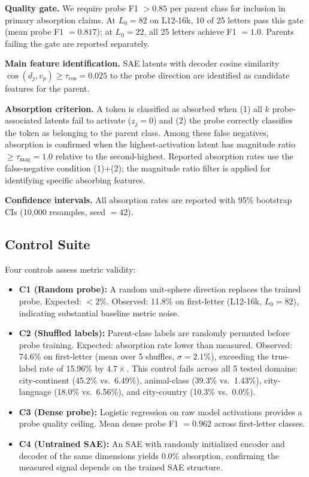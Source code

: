\documentclass{article}
\begin{document}
\textbf{Quality gate.} We require probe F1 $> 0.85$ per parent class for inclusion in primary absorption claims. At $L_0{=}82$ on L12-16k, 10 of 25 letters pass this gate (mean probe F1 $= 0.817$); at $L_0{=}22$, all 25 letters achieve F1 $= 1.0$. Parents failing the gate are reported separately.

\textbf{Main feature identification.} SAE latents with decoder cosine similarity $\cos(d_j, v_p) \geq \tau_{\cos} = 0.025$ to the probe direction are identified as candidate features for the parent.

\textbf{Absorption criterion.} A token is classified as absorbed when (1) all $k$ probe-associated latents fail to activate ($z_j = 0$) and (2) the probe correctly classifies the token as belonging to the parent class. Among these false negatives, absorption is confirmed when the highest-activation latent has magnitude ratio $\geq \tau_{\text{mag}} = 1.0$ relative to the second-highest. Reported absorption rates use the false-negative condition (1)+(2); the magnitude ratio filter is applied for identifying specific absorbing features.

\textbf{Confidence intervals.} All absorption rates are reported with 95\% bootstrap CIs (10,000 resamples, seed $= 42$).

\subsection{Control Suite}

Four controls assess metric validity:

\begin{itemize}
\item \textbf{C1 (Random probe):} A random unit-sphere direction replaces the trained probe. Expected: $< 2\%$. Observed: 11.8\% on first-letter (L12-16k, $L_0{=}82$), indicating substantial baseline metric noise.

\item \textbf{C2 (Shuffled labels):} Parent-class labels are randomly permuted before probe training. Expected: absorption rate lower than measured. Observed: 74.6\% on first-letter (mean over 5 shuffles, $\sigma = 2.1\%$), exceeding the true-label rate of 15.96\% by $4.7\times$. This control fails across all 5 tested domains: city-continent (45.2\% vs.\ 6.49\%), animal-class (39.3\% vs.\ 1.43\%), city-language (18.0\% vs.\ 6.56\%), and city-country (10.3\% vs.\ 0.0\%).

\item \textbf{C3 (Dense probe):} Logistic regression on raw model activations provides a probe quality ceiling. Mean dense probe F1 $= 0.962$ across first-letter classes.

\item \textbf{C4 (Untrained SAE):} An SAE with randomly initialized encoder and decoder of the same dimensions yields 0.0\% absorption, confirming the measured signal depends on the trained SAE structure.
\end{itemize}
\end{document}
